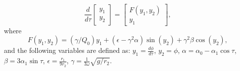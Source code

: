 \documentclass[11pt]{article}
\begin{document}
\begin{equation}
\frac{d}{d \tau}
\begin{bmatrix}
y_1\\
y_2
\end{bmatrix}
=
\begin{bmatrix}
F(y_1, y_2) \\
y_1
\end{bmatrix},
\end{equation}
%
where
%
\begin{equation}
F(y_1, y_2) =
(\gamma / Q_0) y_1 +
(\epsilon - \gamma^2 \alpha) \sin (y_2) +
\gamma^2 \beta \cos(y_2),
\end{equation}
%
and the following variables are defined as:
$y_1 = \frac{d \phi}{d \tau}$, $y_2 = \phi$,
$\alpha = \alpha_0 - \alpha_1 \cos \tau$,
$\beta = 3 \alpha_1 \sin \tau$,
$\epsilon = \frac{r_1}{9 r_2}$,
$\gamma = \frac{1}{3 \omega} \sqrt{g / r_2}$.
\end{document}
